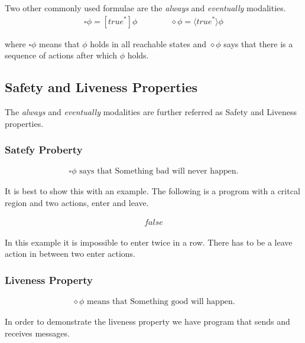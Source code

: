 \documentclass{clseminar}
\begin{document}
  Two other commonly used formulae are the \textit{always} and \textit{eventually} modalities.\\

  \begin{align*}
    \square\phi = [\mathit{true}^*]\phi \qquad\qquad    \diamond\phi = \langle\mathit{true}^*\rangle\phi
  \end{align*}

  where $\square\phi$ means that $\phi$ holds in all reachable states and $\diamond\phi$ says that there is a sequence of actions after which $\phi$ holds. \\

  \subsection{Safety and Liveness Properties}

  The \textit{always} and \textit{eventually} modalities are further referred as Safety and Liveness properties.

  \subsubsection{Satefy Proberty}

  \begin{align*}
    \square\phi \text{ says that Something bad will never happen.}
  \end{align*}

  It is best to show this with an example. The following is a progrom with a critcal region and two actions, enter and leave.

  \begin{align*}
    [\mathit{true}^*\cdot \mathit{enter} \cdot \overline{\mathit{leave}}^* \cdot \mathit{enter}]\mathit{false}
  \end{align*}

  In this example it is impossible to enter twice in a row. There has to be a leave action in
  between two enter actions.

  \pagebreak
  \subsubsection{Liveness Property}

  \begin{align*}
    \diamond\phi \text{ means that Something good will happen.}
  \end{align*}

  In order to demonstrate the liveness property we have program that sends and receives messages.
\end{document}
